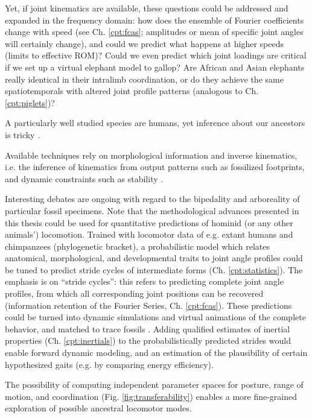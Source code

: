 Yet, if joint kinematics are available, these questions could be addressed and expanded in the frequency domain: how does the ensemble of Fourier coefficients change with speed (see Ch. \ref{cpt:fcas}; amplitudes or mean of specific joint angles will certainly change), and could we predict what happens at higher speeds (limits to effective ROM)?
Could we even predict which joint loadings are critical if we set up a virtual elephant model to gallop?
Are African and Asian elephants really identical in their intralimb coordination, or do they achieve the same spatiotemporals with altered joint profile patterns (analogous to Ch. \ref{cpt:piglets})?

\bigskip
A particularly well studied species are humans, yet inference about our ancestors is tricky \citep{Polk2004,Cazenave2023,Stamos2023}.
\begin{change}
Available techniques rely on morphological information and inverse kinematics, i.e. the inference of kinematics from output patterns such as fossilized footprints, and dynamic constraints such as stability \citep{Pronost2006,Nicolas2006,Nicolas2007,Hatala2016}.
\end{change}
Interesting debates are ongoing with regard to the bipedality and arboreality of particular fossil specimens.
Note that the methodological advances presented in this thesis could be used for quantitative predictions of hominid (or any other animals') locomotion.
Trained with locomotor data of e.g. extant humans and chimpanzees (phylogenetic bracket), a probabilistic model which relates anatomical, morphological, and developmental traits to joint angle profiles could be tuned to predict stride cycles of intermediate forms (Ch. \ref{cpt:statistics}).
The emphasis is on ``stride cycles'': this refers to predicting complete joint angle profiles, from which all corresponding joint positions can be recovered (information retention of the Fourier Series, Ch. \ref{cpt:fcas}).
These predictions could be turned into dynamic simulations and virtual animations of the complete behavior, and matched to trace fossils \citep[as in][but with less manual work]{Nyakatura2019}.
Adding qualified estimates of inertial properties (Ch. \ref{cpt:inertials}) to the probabilistically predicted strides would enable forward dynamic modeling, and an estimation of the plausibility of certain hypothesized gaits (e.g. by comparing energy efficiency).
\begin{change}
The possibility of computing independent parameter spaces for posture, range of motion, and coordination (Fig. \ref{fig:transferability}) enables a more fine-grained exploration of possible ancestral locomotor modes.
\end{change}


